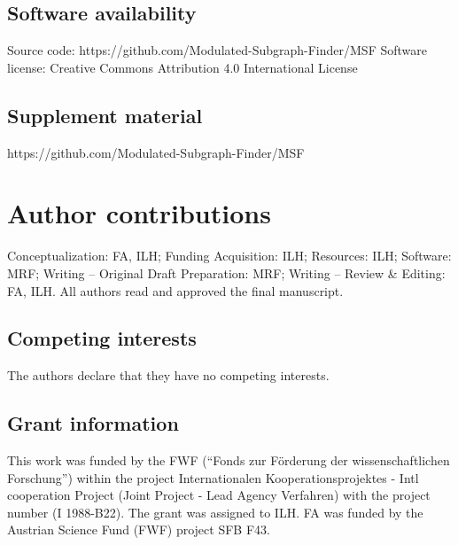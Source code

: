 \documentclass[10pt,a4paper,twocolumn]{article}
\begin{document}
\subsection*{Software availability}

\noindent
Source code: \newline
https://github.com/Modulated-Subgraph-Finder/MSF \newline Software
license: Creative Commons Attribution 4.0 International License


\subsection*{Supplement material}

\noindent
https://github.com/Modulated-Subgraph-Finder/MSF 

\section*{Author contributions}
Conceptualization: FA, ILH; Funding Acquisition: ILH; Resources: ILH;
Software: MRF; Writing – Original Draft Preparation: MRF; Writing – Review
\& Editing: FA, ILH. All authors read and approved the final manuscript.

\subsection*{Competing interests}

The authors declare that they have no competing interests.

\subsection*{Grant information}

This work was funded by the FWF (“Fonds zur F{\"o}rderung der
wissenschaftlichen Forschung”) within the project Internationalen
Kooperationsprojektes - Intl cooperation Project (Joint Project - Lead
Agency Verfahren) with the project number (I 1988-B22). The grant was
assigned to ILH. FA was funded by the Austrian Science Fund (FWF) project
SFB F43.


{\small
}

\bigskip



\begin{figure}
	\centering

\end{figure}
\end{document}
